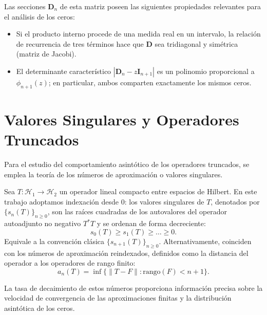 Las secciones $\mathbf{D}_n$ de esta matriz poseen las siguientes propiedades relevantes para el análisis de los ceros:

\begin{itemize}
	\item Si el producto interno procede de una medida real en un intervalo, la relación de recurrencia de tres términos hace que $\mathbf{D}$ sea tridiagonal y simétrica (matriz de Jacobi).
	\item El determinante característico $|\mathbf{D}_n - z\mathbf{I}_{n+1}|$ es un polinomio proporcional a $\phi_{n+1}(z)$; en particular, ambos comparten exactamente los mismos ceros.
\end{itemize}

\section{Valores Singulares y Operadores Truncados}

Para el estudio del comportamiento asintótico de los operadores truncados, se emplea la teoría de los números de aproximación o valores singulares.

\begin{defn}
	Sea $T: \mathcal{H}_1 \to \mathcal{H}_2$ un operador lineal compacto entre espacios de Hilbert. En este trabajo adoptamos indexación desde $0$: los valores singulares de $T$, denotados por $\{s_n(T)\}_{n \geq 0}$, son las raíces cuadradas de los autovalores del operador autoadjunto no negativo $T^*T$ y se ordenan de forma decreciente:
	\begin{equation}
		s_0(T) \geq s_1(T) \geq \dots \geq 0.
	\end{equation}
	Equivale a la convención clásica $\{s_{n+1}(T)\}_{n\ge0}$. Alternativamente, coinciden con los números de aproximación reindexados, definidos como la distancia del operador a los operadores de rango finito:
	\begin{equation}
		a_n(T) = \inf \{ \|T - F\| : \text{rango}(F) < n+1 \}.
	\end{equation}
\end{defn}

La tasa de decaimiento de estos números proporciona información precisa sobre la velocidad de convergencia de las aproximaciones finitas y la distribución asintótica de los ceros.

